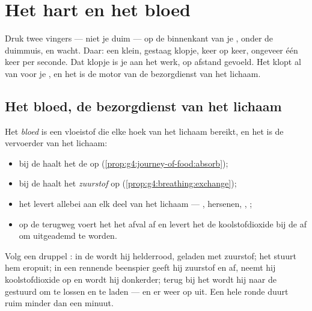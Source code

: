\chapter{Het hart en het bloed}\label{ch:g4:heart-and-blood}

Druk twee vingers --- niet je duim --- op de binnenkant van je ,
onder de duimmuis, en wacht. Daar: een klein, gestaag klopje, keer op
keer, ongeveer één keer per seconde. Dat klopje is je  aan het werk,
op afstand gevoeld. Het klopt al van voor je , en het is de
motor van de bezorgdienst van het lichaam.

\section{Het bloed, de bezorgdienst van het lichaam}

\begin{proposition}\label{prop:g4:heart-and-blood:carries}
Het \emph{bloed} is een vloeistof die elke hoek van het
lichaam bereikt, en het is de vervoerder van het lichaam:
\begin{itemize}
  \item bij de  haalt het de \emph{} op
        (\cref{prop:g4:journey-of-food:absorb});
  \item bij de  haalt het \emph{zuurstof} op
        (\cref{prop:g4:breathing:exchange});
  \item het levert allebei aan elk deel van het lichaam --- ,
        hersenen, , ;
  \item op de terugweg voert het het afval af en levert het de
        koolstofdioxide bij de  af om uitgeademd te worden.
\end{itemize}
\end{proposition}
\admitted

\begin{example}\label{ex:g4:heart-and-blood:round}
Volg een druppel : in de  wordt hij helderrood, geladen met
zuurstof; het  stuurt hem eropuit; in een rennende beenspier geeft
hij zuurstof en  af, neemt hij koolstofdioxide op en
wordt hij donkerder; terug bij het  wordt hij naar de 
gestuurd om te lossen en te laden --- en er weer op uit. Een hele ronde
duurt ruim minder dan een minuut.
\end{example}

